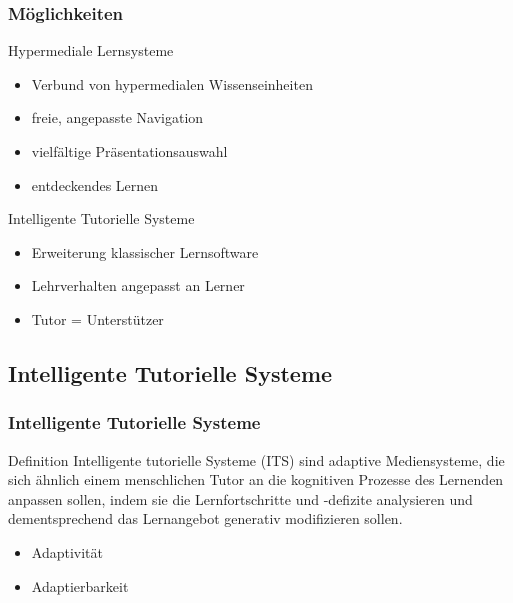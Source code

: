 \documentclass{beamer}
\begin{document}
\begin{frame}
  \frametitle{Möglichkeiten}
  \begin{block}{Hypermediale Lernsysteme}
    \begin{itemize}
      \item Verbund von hypermedialen Wissenseinheiten
      \item freie, angepasste Navigation
      \item vielfältige Präsentationsauswahl
      \item entdeckendes Lernen
    \end{itemize}
  \end{block}

  \begin{block}{Intelligente Tutorielle Systeme}
    \begin{itemize}
      \item Erweiterung klassischer Lernsoftware
      \item Lehrverhalten angepasst an Lerner
      \item Tutor = Unterstützer
    \end{itemize}
  \end{block}
\end{frame}


\subsection{Intelligente Tutorielle Systeme}
\begin{frame}
  \frametitle{Intelligente Tutorielle Systeme}
  \begin{block}{Definition}
    Intelligente tutorielle Systeme (ITS) sind adaptive Mediensysteme, die sich ähnlich
    einem menschlichen Tutor an die kognitiven Prozesse des Lernenden anpassen
    sollen, indem sie die Lernfortschritte und -defizite analysieren und dementsprechend
    das Lernangebot generativ modifizieren sollen.
  \end{block}

  \begin{itemize}
    \item Adaptivität
    \item Adaptierbarkeit
  \end{itemize}
\end{frame}
\end{document}
